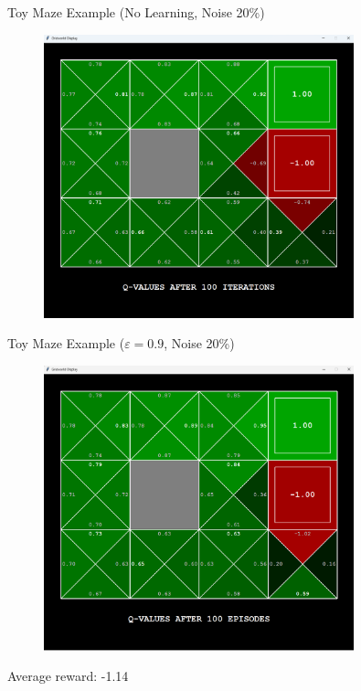 \documentclass[11pt,table]{beamer}
\begin{document}
\begin{frame}{Toy Maze Example (No Learning, Noise 20\%)}
\begin{figure}
	\centering
		\includegraphics[width=0.80\textwidth]{figures/gridworld_qvalues.png}
	\label{fig:gridworld_values}
\end{figure}

\end{frame}

\begin{frame}{Toy Maze Example ($\varepsilon=0.9$, Noise 20\%)}
\begin{figure}
	\centering
		\includegraphics[width=0.80\textwidth]{figures/gridworld_qvalues_epsilon90.png}
	\label{fig:gridworld_values}
\end{figure}
Average reward: -1.14
\end{frame}
\end{document}
